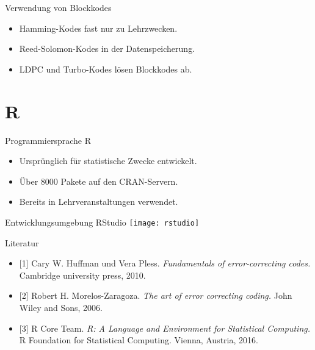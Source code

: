 \documentclass[xcolor=dvipsnames]{beamer}
\makeatletter
\newcommand{\semfootnote}[1]{\let\thefootnote\relax\footnotetext{#1}}
\def\ScaleIfNeeded{%
\ifdim\Gin@nat@width>\linewidth
\linewidth
\else
\Gin@nat@width
\fi
}
\makeatother
\begin{document}
\begin{frame}{Verwendung von Blockkodes}

\begin{itemize}[<+->]
\item Hamming-Kodes fast nur zu Lehrzwecken.
\item Reed-Solomon-Kodes in der Datenspeicherung.
\item LDPC und Turbo-Kodes lösen Blockkodes ab.
\end{itemize}

\end{frame}

\section{R}

\begin{frame}{Programmiersprache R}
\begin{itemize}[<+->]
\item Ursprünglich für statistische Zwecke entwickelt.
\item Über 8000 Pakete auf den CRAN-Servern.
\item Bereits in Lehrveranstaltungen verwendet.
\end{itemize}
\semfootnote{Quelle: [3]}
\end{frame}

\begin{frame}{Entwicklungsumgebung RStudio}
\texttt{[image: rstudio]}
\end{frame}

\begin{frame}{Literatur}
\begin{itemize}
\item {[1]} Cary W. Huffman und Vera Pless. \emph{Fundamentals of error-correcting
codes.} Cambridge university press, 2010.
\item {[2]} Robert H. Morelos-Zaragoza. \emph{The art of error correcting coding.} John
Wiley and Sons, 2006.
\item {[3]} R Core Team. \emph{R: A Language and Environment for Statistical Computing.}
R Foundation for Statistical Computing. Vienna, Austria, 2016.
\end{itemize}
\end{frame}
\end{document}
